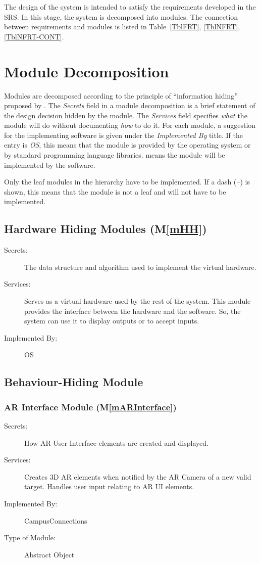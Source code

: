 \documentclass[12pt, titlepage]{article}
\newcommand{\mref}[1]{M\ref{#1}}
\begin{document}
The design of the system is intended to satisfy the requirements developed in
the SRS. In this stage, the system is decomposed into modules. The connection
between requirements and modules is listed in Table~\ref{TblFRT}, \ref{TblNFRT}, \ref{TblNFRT-CONT}.

\section{Module Decomposition} \label{SecMD}

Modules are decomposed according to the principle of ``information hiding''
proposed by \citet{ParnasEtAl1984}. The \emph{Secrets} field in a module
decomposition is a brief statement of the design decision hidden by the
module. The \emph{Services} field specifies \emph{what} the module will do
without documenting \emph{how} to do it. For each module, a suggestion for the
implementing software is given under the \emph{Implemented By} title. If the
entry is \emph{OS}, this means that the module is provided by the operating
system or by standard programming language libraries.  \emph{\progname{}} means the
module will be implemented by the \progname{} software.

Only the leaf modules in the hierarchy have to be implemented. If a dash
(\emph{--}) is shown, this means that the module is not a leaf and will not have
to be implemented.

\subsection{Hardware Hiding Modules (\mref{mHH})}

\begin{description}
\item[Secrets:]The data structure and algorithm used to implement the virtual
  hardware.
\item[Services:]Serves as a virtual hardware used by the rest of the
  system. This module provides the interface between the hardware and the
  software. So, the system can use it to display outputs or to accept inputs.
\item[Implemented By:] OS
\end{description}

\subsection{Behaviour-Hiding Module}
\subsubsection{AR Interface Module (\mref{mARInterface})}
\begin{description}
\item[Secrets:]How AR User Interface elements are created and displayed.
\item[Services:]Creates 3D AR elements when notified by the AR Camera of a new valid target. Handles user input relating to AR UI elements.
\item[Implemented By:] CampusConnections
\item[Type of Module:] Abstract Object
\end{description}
\end{document}
